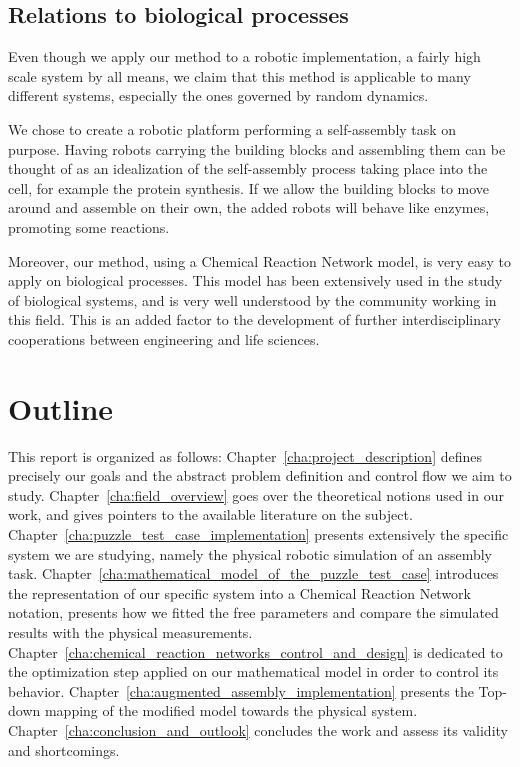 \subsection{Relations to biological processes} %
\label{sub:relations_to_biological_processes}
	Even though we apply our method to a robotic implementation, a fairly high scale system by all means, we claim that this method is applicable to many different systems, especially the ones governed by random dynamics.
	
	We chose to create a robotic platform performing a self-assembly task on purpose. Having robots carrying the building blocks and assembling them can be thought of as an idealization of the self-assembly process taking place into the cell, for example the protein synthesis. If we allow the building blocks to move around and assemble on their own, the added robots will behave like enzymes, promoting some reactions.
	
	Moreover, our method, using a Chemical Reaction Network model, is very easy to apply on biological processes. This model has been extensively used in the study of biological systems, and is very well understood by the community working in this field. This is an added factor to the development of further interdisciplinary cooperations between engineering and life sciences.



\section{Outline} %
\label{sec:outline}
	This report is organized as follows: Chapter~\ref{cha:project_description} defines precisely our goals and the abstract problem definition and control flow we aim to study. Chapter~\ref{cha:field_overview} goes over the theoretical notions used in our work, and gives pointers to the available literature on the subject. Chapter~\ref{cha:puzzle_test_case_implementation} presents extensively the specific system we are studying, namely the physical robotic simulation of an assembly task. Chapter~\ref{cha:mathematical_model_of_the_puzzle_test_case} introduces the representation of our specific system into a Chemical Reaction Network notation, presents how we fitted the free parameters and compare the simulated results with the physical measurements. Chapter~\ref{cha:chemical_reaction_networks_control_and_design} is dedicated to the optimization step applied on our mathematical model in order to control its behavior. Chapter~\ref{cha:augmented_assembly_implementation} presents the Top-down mapping of the modified model towards the physical system. Chapter~\ref{cha:conclusion_and_outlook} concludes the work and assess its validity and shortcomings.
